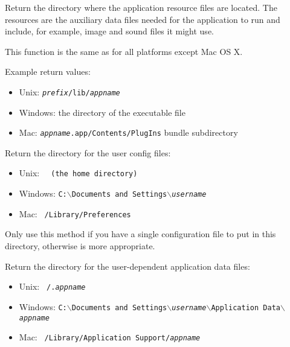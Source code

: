 


\label{wxstandardpathsgetresourcesdir}


Return the directory where the application resource files are located. The
resources are the auxiliary data files needed for the application to run and
include, for example, image and sound files it might use.

This function is the same as  for
all platforms except Mac OS X.

Example return values:
\begin{itemize}
    \item Unix: \texttt{\textit{prefix}/lib/\textit{appname}}
    \item Windows: the directory of the executable file
    \item Mac: \texttt{\textit{appname}.app/Contents/PlugIns} bundle subdirectory
\end{itemize}




\label{wxstandardpathsgetuserconfigdir}


Return the directory for the user config files:
\begin{itemize}
    \item Unix: \tt{~} (the home directory)
    \item Windows: \tt{C:$\backslash$Documents and Settings$\backslash$\textit{username}}
    \item Mac: \tt{~/Library/Preferences}
\end{itemize}

Only use this method if you have a single configuration file to put in this
directory, otherwise  is
more appropriate.


\label{wxstandardpathsgetuserdatadir}


Return the directory for the user-dependent application data files:
\begin{itemize}
    \item Unix: \tt{~/.\textit{appname}}
    \item Windows: \tt{C:$\backslash$Documents and Settings$\backslash$\textit{username}$\backslash$Application Data$\backslash$\textit{appname}}
    \item Mac: \tt{~/Library/Application Support/\textit{appname}}
\end{itemize}


